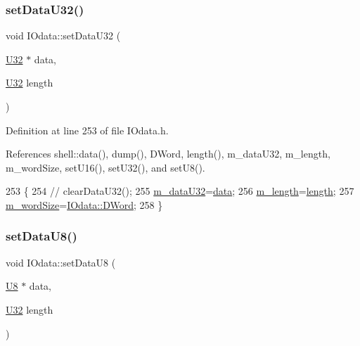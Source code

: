 \subsubsection{\texorpdfstring{set\+Data\+U32()}{setDataU32()}}
{\footnotesize\ttfamily void I\+Odata\+::set\+Data\+U32 (\begin{DoxyParamCaption}\item[{\hyperlink{classIOdata_a96fb57f5fcd87b708743abd3c86a5198}{U32} $\ast$}]{data,  }\item[{\hyperlink{classIOdata_a96fb57f5fcd87b708743abd3c86a5198}{U32}}]{length }\end{DoxyParamCaption})\hspace{0.3cm}{\ttfamily [inline]}}



Definition at line 253 of file I\+Odata.\+h.



References shell\+::data(), dump(), D\+Word, length(), m\+\_\+data\+U32, m\+\_\+length, m\+\_\+word\+Size, set\+U16(), set\+U32(), and set\+U8().


\begin{DoxyCode}
253                                         \{
254 \textcolor{comment}{//    clearDataU32();}
255     \hyperlink{classIOdata_a247cdaefd87084e3cad1d530d592d99a}{m\_dataU32}=\hyperlink{namespaceshell_a5ea2525995cedc3efd69ea8a7f034d1e}{data};
256     \hyperlink{classIOdata_afabe57441da019eb614d277799106aac}{m\_length}=\hyperlink{classIOdata_abb40e71ce0290832a24857b4a1e7b1a3}{length};
257     \hyperlink{classIOdata_a719b0ce607ada4fa91b12d6ecfa1b4c9}{m\_wordSize}=\hyperlink{classIOdata_a37c53ebf4bf8d866aac8af572962a84ca458da82d97e3ea9715c34b558c34f734}{IOdata::DWord};
258   \}
\end{DoxyCode}
\mbox{\label{classIOdata_afece89b7035f6eec001cd397f07c062d}} 
\subsubsection{\texorpdfstring{set\+Data\+U8()}{setDataU8()}}
{\footnotesize\ttfamily void I\+Odata\+::set\+Data\+U8 (\begin{DoxyParamCaption}\item[{\hyperlink{classIOdata_a18d1354b7cdaf0f8a8001fdbb3ced418}{U8} $\ast$}]{data,  }\item[{\hyperlink{classIOdata_a96fb57f5fcd87b708743abd3c86a5198}{U32}}]{length }\end{DoxyParamCaption})\hspace{0.3cm}{\ttfamily [inline]}}



